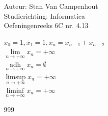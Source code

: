 \documentclass[a4paper]{article}
\begin{document}
  
\noindent \large Auteur: Stan Van Campenhout \\
\noindent \large Studierichting:  Informatica\\
\noindent \large Oefeningenreeks 6C nr. 4.13\\

\medskip

\normalsize

$ x_0 = 1, x_1 = 1, x_n = x_{n-1} + x_{n-2} $\\

$ \lim\limits_{n\rightarrow+\infty}x_n = +\infty $\\

$\displaystyle \mathop{\mathrm{adh}}\limits_{n \rightarrow +\infty} x_n = \emptyset $\\

$ \limsup\limits_{n\rightarrow+\infty} x_n = +\infty $\\

$ \liminf\limits_{n\rightarrow+\infty} x_n = +\infty $\\

\begin{thebibliography}{999}
\end{thebibliography}
\end{document}
